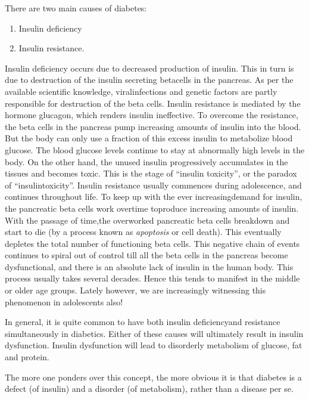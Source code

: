 There are two main causes of diabetes:
\begin{enumerate}
\itemsep=0pt
\item Insulin deficiency
 \item Insulin resistance.
\end{enumerate}

Insulin deficiency occurs due to decreased production of insulin. This in turn is due to destruction of the insulin secreting beta\break cells in the pancreas. As per the available scientific knowledge, viral\break infe\-ctions and genetic factors are partly responsible for destruction of the beta cells. Insulin resistance is mediated by the hormone glucagon, which renders insulin ineffective. To overcome the resistance, the beta cells in the pancreas pump increasing amounts of insulin into the blood. But the body can only use a fraction of this excess insulin to meta\-bolize blood glucose. The blood glucose levels continue to stay at abnormally high levels in the body. On the other hand, the unused insu\-lin progressively accumulates in the tissues and becomes toxic. This is the stage of “insulin toxicity”, or the paradox of “insulin\break toxicity”. Insulin resi\-stance usually commences during adolescence, and continues throughout life. To keep up with the ever increasing\break demand for insulin, the pancreatic beta cells work overtime to\break produce increasing amounts of insulin. With the passage of time,\break the overworked pancreatic beta cells breakdown and start to die (by a process known as \textit{apoptosis} or cell death). This eventually depletes the total number of functioning beta cells. This negative chain of events conti\-nues to spiral out of control till all the beta cells in the pancreas become dysfunc\-tional, and there is an absolute lack of insulin in the human body. This process usually takes several decades. Hence this tends to manifest in the middle or older age groups. Lately however, we are increasingly witnessing this phenomenon in adolescents also!

In general, it is quite common to have both insulin deficiency\break and resistance simultaneously in diabetics. Either of these causes will ultimately result in insulin dysfunction. Insulin dysfunction will lead to disorderly metabolism of glucose, fat and protein.

The more one ponders over this concept, the more obvious it is that diabetes is a defect (of insulin) and a disorder (of metabolism), rather than a disease per se.

